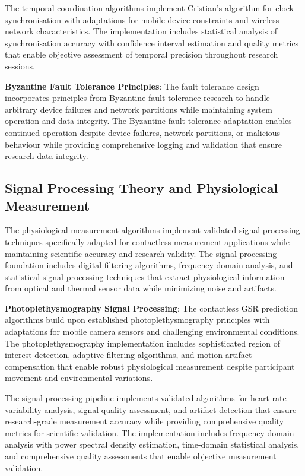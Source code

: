 \documentclass[11pt,a4paper]{report}
\begin{document}
The temporal coordination algorithms implement Cristian's algorithm for clock synchronisation with adaptations for mobile device constraints and wireless network characteristics. The implementation includes statistical analysis of synchronisation accuracy with confidence interval estimation and quality metrics that enable objective assessment of temporal precision throughout research sessions.

\noindent \textbf{Byzantine Fault Tolerance Principles}: The fault tolerance design incorporates principles from Byzantine fault tolerance research to handle arbitrary device failures and network partitions while maintaining system operation and data integrity. The Byzantine fault tolerance adaptation enables continued operation despite device failures, network partitions, or malicious behaviour while providing comprehensive logging and validation that ensure research data integrity.

\subsection{Signal Processing Theory and Physiological Measurement}

The physiological measurement algorithms implement validated signal processing techniques specifically adapted for contactless measurement applications while maintaining scientific accuracy and research validity. The signal processing foundation includes digital filtering algorithms, frequency-domain analysis, and statistical signal processing techniques that extract physiological information from optical and thermal sensor data while minimizing noise and artifacts.

\noindent \textbf{Photoplethysmography Signal Processing}: The contactless GSR prediction algorithms build upon established photoplethysmography principles with adaptations for mobile camera sensors and challenging environmental conditions. The photoplethysmography implementation includes sophisticated region of interest detection, adaptive filtering algorithms, and motion artifact compensation that enable robust physiological measurement despite participant movement and environmental variations.

The signal processing pipeline implements validated algorithms for heart rate variability analysis, signal quality assessment, and artifact detection that ensure research-grade measurement accuracy while providing comprehensive quality metrics for scientific validation. The implementation includes frequency-domain analysis with power spectral density estimation, time-domain statistical analysis, and comprehensive quality assessments that enable objective measurement validation.
\end{document}
